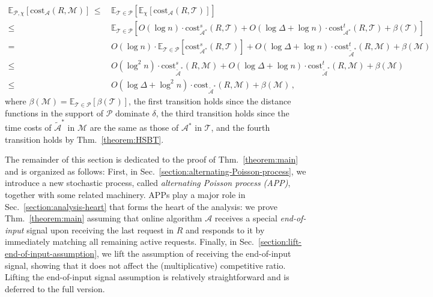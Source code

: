 \documentclass[11pt]{article}
\def\LongVersion{}
\def\LongVersionEnd{}
\def\ShortVersion{}
\def\ShortVersionEnd{}
\theoremstyle{definition}
\theoremstyle{plain}
\theoremstyle{definition}
\theoremstyle{plain}
\theoremstyle{definition}
\theoremstyle{plain}
\newcommand{\Sect}{Sec.}
\newcommand{\Thm}{Thm.}
\newcommand{\Expect}{\mathbb{E}}
\newcommand{\sCost}{\mathrm{cost}^{\mathit{s}}}
\newcommand{\tCost}{\mathrm{cost}^{\mathit{t}}}
\newcommand{\Cost}{\mathrm{cost}}
\newcommand{\A}{\mathcal{A}}
\begin{document}
\begin{align*}
\Expect_{\mathcal{P}, \chi} \left[ \Cost_{\A} \left( R, \mathcal{M} \right)
\right]
\, \leq \, &
\Expect_{\mathcal{T} \in \mathcal{P}} \left[
\Expect_{\chi} \left[ \Cost_{\A} \left( R, \mathcal{T} \right) \right]
\right] \\
\leq \, &
\Expect_{\mathcal{T} \in \mathcal{P}} \left[
O (\log n) \cdot \sCost_{\A^{*}} \left( R, \mathcal{T} \right)
+
O (\log \Delta + \log n) \cdot \tCost_{\A^{*}} \left( R, \mathcal{T}
\right)
+
\beta(\mathcal{T})
\right] \\
= \, &
O (\log n) \cdot \Expect_{\mathcal{T} \in \mathcal{P}} \left[ \sCost_{\A^{*}} \left(
R, \mathcal{T} \right) \right]
+
O (\log \Delta + \log n) \cdot \tCost_{\widetilde{\A}^{*}} \left( R, \mathcal{M}
\right)
+
\beta(\mathcal{M}) \\
\leq \, &
O \left( \log^{2} n \right) \cdot \sCost_{\widetilde{\A}^{*}} \left( R,
\mathcal{M} \right)
+
O (\log \Delta + \log n) \cdot \tCost_{\widetilde{\A}^{*}} \left( R, \mathcal{M}
\right)
+
\beta(\mathcal{M}) \\
\leq \, &
O \left( \log \Delta + \log^{2} n \right) \cdot \Cost_{\widetilde{\A}^{*}} \left(
R, \mathcal{M} \right)
+
\beta(\mathcal{M}) \, ,
\end{align*}
where
$\beta(\mathcal{M}) = \Expect_{\mathcal{T} \in \mathcal{P}}[\beta(\mathcal{T})]$,
the first transition holds since the distance functions in the
support of $\mathcal{P}$ dominate $\delta$,
the third transition holds since the time costs of
$\widetilde{\A}^{*}$ in $\mathcal{M}$ are the same as those of $\A^{*}$ in
$\mathcal{T}$, and
the fourth transition holds by \Thm{}~\ref{theorem:HSBT}.
\par
\LongVersionEnd %
%
The remainder of this section is dedicated to the proof of
\Thm{}~\ref{theorem:main} and is organized as follows:
First, in \Sect{}~\ref{section:alternating-Poisson-process}, we introduce a
new stochastic process, called \emph{alternating Poisson process (APP)},
together with some related machinery.
APPs play a major role in \Sect{}~\ref{section:analysis-heart} that forms the
heart of the analysis:
we prove \Thm{}~\ref{theorem:main} assuming that online algorithm $\A$
receives a special \emph{end-of-input} signal upon receiving the last request
in $R$ and responds to it by immediately matching all remaining active
requests.
\LongVersion %
Finally, in \Sect{}~\ref{section:lift-end-of-input-assumption}, we lift the
assumption of receiving the end-of-input signal, showing that it does not
affect the (multiplicative) competitive ratio.
\LongVersionEnd %
%
\ShortVersion %
Lifting the end-of-input signal assumption is relatively straightforward and
is deferred to the full version.
\ShortVersionEnd %
\end{document}
